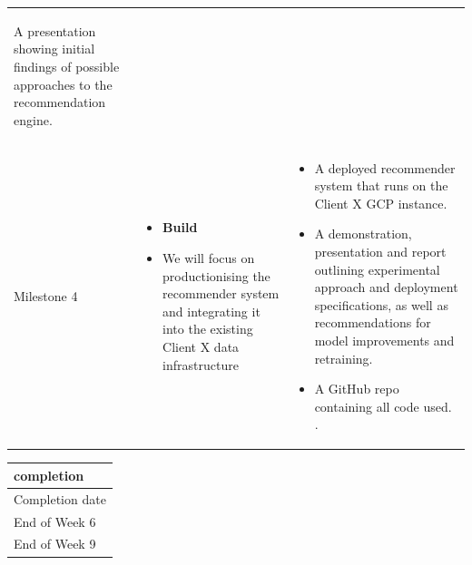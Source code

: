 \documentclass[
]{book}
\providecommand{\tightlist}{%
  \setlength{\itemsep}{0pt}\setlength{\parskip}{0pt}}
\begin{document}
\begin{longtable}[]{@{}lll@{}}
\begin{minipage}[t]{0.40\columnwidth}
\begin{itemize}
  A presentation showing
  initial findings of possible
  approaches to the
  recommendation engine.
\end{itemize}\strut
\end{minipage}\tabularnewline
\begin{minipage}[t]{0.17\columnwidth}\raggedright
Milestone 4\strut
\end{minipage} & \begin{minipage}[t]{0.35\columnwidth}\raggedright
\begin{itemize}
\tightlist
\item
  \textbf{Build}
\item
  We will focus on
  productionising the
  recommender system and
  integrating it into the
  existing Client X data
  infrastructure
\end{itemize}\strut
\end{minipage} & \begin{minipage}[t]{0.40\columnwidth}\raggedright
\begin{itemize}
\tightlist
\item
  A deployed recommender
  system that runs on the Client
  X GCP instance.
\item
  A demonstration,
  presentation and report
  outlining experimental
  approach and deployment
  specifications, as well as
  recommendations for model
  improvements and retraining.
\item
  A GitHub repo containing
  all code used.
  .
\end{itemize}\strut
\end{minipage}\tabularnewline
\bottomrule
\end{longtable}

\begin{longtable}[]{@{}l@{}}
\toprule
\begin{minipage}[b]{0.24\columnwidth}\raggedright
completion\strut
\end{minipage}\tabularnewline
\midrule
\endhead
\begin{minipage}[t]{0.24\columnwidth}\raggedright
Completion date\strut
\end{minipage}\tabularnewline
\begin{minipage}[t]{0.24\columnwidth}\raggedright
End of Week 6\strut
\end{minipage}\tabularnewline
\begin{minipage}[t]{0.24\columnwidth}\raggedright
End of Week 9\strut
\end{minipage}\tabularnewline
\bottomrule
\end{longtable}
\end{document}
